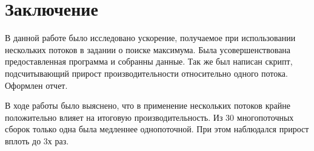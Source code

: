\documentclass[a4paper, 12pt]{article}
\begin{document}




\section{Заключение}

В данной работе было исследовано ускорение, получаемое при использовании нескольких потоков в задании о поиске максимума.
Была усовершенствована предоставленная программа и собранны данные.
Так же был написан скрипт, подсчитывающий прирост производительности относительно одного потока.
Оформлен отчет.

В ходе работы было выяснено, что в применение нескольких потоков крайне положительно влияет на итоговую производительность.
Из 30 многопоточных сборок только одна была медленнее однопоточной.
При этом наблюдался прирост вплоть до 3х раз.


\end{document}
